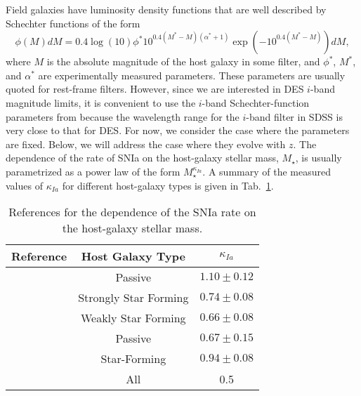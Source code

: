 \documentclass[preprint2]{aastex}    %
\begin{document}
Field galaxies have luminosity density functions that are
well described by Schechter functions of the form
\begin{equation}
  \phi(M)dM=0.4\log(10)\phi^{*}10^{0.4(M^{*}-M)(\alpha^{*}+1)}\exp(-10^{0.4(M^{*}-M)})dM,
\label{eqn:gf-shechter}
\end{equation}
where $M$ is the absolute magnitude of the host galaxy in some filter, and 
$\phi^{*}$, $M^{*}$, and $\alpha^{*}$ are experimentally measured parameters.
These parameters are usually quoted for rest-frame filters. However, since we are interested in
DES $i$-band magnitude limits, it is convenient to use
the $i$-band Schechter-function parameters from \cite{bla03} because the wavelength range for
the $i$-band filter in SDSS is very close to that for DES. 
For now, we consider the case where the parameters
are fixed. Below, we will address the case where they evolve with $z$.
The dependence of the rate of SNIa on the host-galaxy stellar mass, $M_\star$,
is usually parametrized as a power law of the form $M_\star^{\kappa_{Ia}}$. A summary of the 
measured values of $\kappa_{Ia}$ for different host-galaxy types is given in Tab.~\ref{tab:rIavalues}.

\begin{table}[h]
\centering%
\begin{tabular}
[c]{|c|c|c|}\hline
Reference & Host Galaxy Type & $\kappa_{Ia}$\\
\hline
\cite{sul06} & Passive & $1.10\pm 0.12$\\
\cite{sul06} & Strongly Star Forming & $0.74\pm 0.08$\\
\cite{sul06} & Weakly Star Forming & $0.66\pm 0.08$\\
\cite{smi11}     & Passive & $0.67\pm 0.15$\\
\cite{smi11}     & Star-Forming & $0.94\pm 0.08$\\
\cite{li11-2}        & All & 0.5 \\
\hline
\end{tabular}
\caption{References for the dependence of the SNIa rate on the host-galaxy stellar mass.}
\label{tab:rIavalues}%
\end{table}
\end{document}

